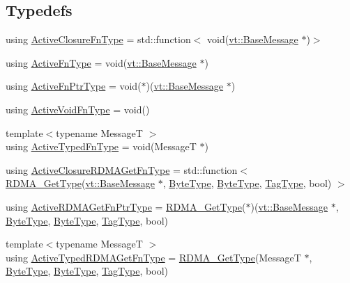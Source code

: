 \subsection*{Typedefs}
\begin{DoxyCompactItemize}
\item 
using \hyperlink{namespacevt_a2a06c34cafcd511828f16cbf1476b924}{Active\+Closure\+Fn\+Type} = std\+::function$<$ void(\hyperlink{namespacevt_ac34f95a5e2b8109b55bfba52b074443d}{vt\+::\+Base\+Message} $\ast$)$>$
\item 
using \hyperlink{namespacevt_a546925d221208866b866b2edf8f24d04}{Active\+Fn\+Type} = void(\hyperlink{namespacevt_ac34f95a5e2b8109b55bfba52b074443d}{vt\+::\+Base\+Message} $\ast$)
\item 
using \hyperlink{namespacevt_a70e19bd64d031e65083c2125b2c65426}{Active\+Fn\+Ptr\+Type} = void($\ast$)(\hyperlink{namespacevt_ac34f95a5e2b8109b55bfba52b074443d}{vt\+::\+Base\+Message} $\ast$)
\item 
using \hyperlink{namespacevt_ad0569ad32e87f0c5fb53fccd669f8dfa}{Active\+Void\+Fn\+Type} = void()
\item 
{\footnotesize template$<$typename MessageT $>$ }\\using \hyperlink{namespacevt_a54eefd5373739c7365058b0d22fea6e2}{Active\+Typed\+Fn\+Type} = void(MessageT $\ast$)
\item 
using \hyperlink{namespacevt_aac79af69904337145f4d3d441802c932}{Active\+Closure\+R\+D\+M\+A\+Get\+Fn\+Type} = std\+::function$<$ \hyperlink{namespacevt_a1cab7f4860f65a49ad2c042d6240f288}{R\+D\+M\+A\+\_\+\+Get\+Type}(\hyperlink{namespacevt_ac34f95a5e2b8109b55bfba52b074443d}{vt\+::\+Base\+Message} $\ast$, \hyperlink{namespacevt_aab8d55968084610ce3b17057981e9300}{Byte\+Type}, \hyperlink{namespacevt_aab8d55968084610ce3b17057981e9300}{Byte\+Type}, \hyperlink{namespacevt_a84ab281dae04a52a4b243d6bf62d0e52}{Tag\+Type}, bool) $>$
\item 
using \hyperlink{namespacevt_ae4fbf97da623bfcd09ee8379de756257}{Active\+R\+D\+M\+A\+Get\+Fn\+Ptr\+Type} = \hyperlink{namespacevt_a1cab7f4860f65a49ad2c042d6240f288}{R\+D\+M\+A\+\_\+\+Get\+Type}($\ast$)(\hyperlink{namespacevt_ac34f95a5e2b8109b55bfba52b074443d}{vt\+::\+Base\+Message} $\ast$, \hyperlink{namespacevt_aab8d55968084610ce3b17057981e9300}{Byte\+Type}, \hyperlink{namespacevt_aab8d55968084610ce3b17057981e9300}{Byte\+Type}, \hyperlink{namespacevt_a84ab281dae04a52a4b243d6bf62d0e52}{Tag\+Type}, bool)
\item 
{\footnotesize template$<$typename MessageT $>$ }\\using \hyperlink{namespacevt_add83fe11410931719f6543a575acfe87}{Active\+Typed\+R\+D\+M\+A\+Get\+Fn\+Type} = \hyperlink{namespacevt_a1cab7f4860f65a49ad2c042d6240f288}{R\+D\+M\+A\+\_\+\+Get\+Type}(MessageT $\ast$, \hyperlink{namespacevt_aab8d55968084610ce3b17057981e9300}{Byte\+Type}, \hyperlink{namespacevt_aab8d55968084610ce3b17057981e9300}{Byte\+Type}, \hyperlink{namespacevt_a84ab281dae04a52a4b243d6bf62d0e52}{Tag\+Type}, bool)

\end{DoxyCompactItemize}
